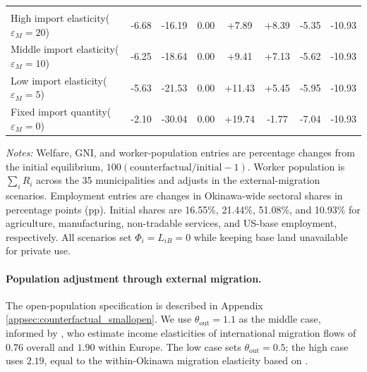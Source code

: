 \documentclass[12pt, unicode, a4paper]{article}
\newcommand{\1}{\mbox{1}\hspace{-0.25em}\mbox{l}} %
\begin{document}
{\begin{table}[!htbp]
\begin{threeparttable}
\begin{tabularx}{\textwidth}{@{}>{\raggedright\arraybackslash}X *{7}{S[table-format=+2.2]}@{}}
    \addlinespace[0.35em]
     \\
    High import elasticity\newline ($\varepsilon_M=20$) & -6.68 & -16.19 & 0.00 & +7.89 & +8.39 & -5.35 & -10.93 \\
    Middle import elasticity\newline ($\varepsilon_M=10$) & -6.25 & -18.64 & 0.00 & +9.41 & +7.13 & -5.62 & -10.93 \\
    Low import elasticity\newline ($\varepsilon_M=5$) & -5.63 & -21.53 & 0.00 & +11.43 & +5.45 & -5.95 & -10.93 \\
    Fixed import quantity\newline ($\varepsilon_M=0$) & -2.10 & -30.04 & 0.00 & +19.74 & -1.77 & -7.04 & -10.93 \\
    \bottomrule
  \end{tabularx}
  \begin{tablenotes}[flushleft]
    \footnotesize
    \item \textit{Notes:} Welfare, GNI, and worker-population entries are percentage changes from the initial equilibrium, $100(\text{counterfactual}/\text{initial}-1)$. Worker population is $\sum_i R_i$ across the 35 municipalities and adjusts in the external-migration scenarios. Employment entries are changes in Okinawa-wide sectoral shares in percentage points (pp). Initial shares are 16.55\%, 21.44\%, 51.08\%, and 10.93\% for agriculture, manufacturing, non-tradable services, and US-base employment, respectively. All scenarios set $\Phi_i=L_{iB}=0$ while keeping base land unavailable for private use.
  \end{tablenotes}
  \end{threeparttable}
\end{table}
}

\paragraph{Population adjustment through external migration.}
The open-population specification is described in Appendix \ref{appsec:counterfactual_smallopen}. We use $\theta_{\mathrm{out}}=1.1$ as the middle case, informed by , who estimate income elasticities of international migration flows of $0.76$ overall and $1.90$ within Europe. The low case sets $\theta_{\mathrm{out}}=0.5$; the high case uses $2.19$, equal to the within-Okinawa migration elasticity based on .
\end{document}
